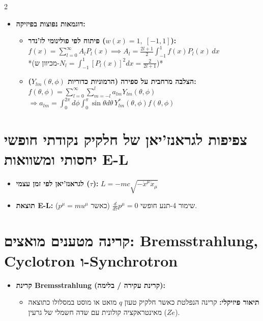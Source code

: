 \documentclass[10pt,a4paper]{article}
\begin{document}
\begin{multicols*}{2}
\begin{itemize}[leftmargin=*]
    \item \textbf{דוגמאות נפוצות בפיזיקה:}

    \begin{itemize}

        \item \textbf{פיתוח לפי פולינומי לז'נדר ($w(x)=1, \; [-1, 1]$):}\\
        $f(x) = \sum_{l=0}^{\infty} A_l P_l(x) \implies A_l = \frac{2l+1}{2} \int_{-1}^{1} f(x) P_l(x) \, dx$\\
        *(מכיוון ש-$N_l = \int_{-1}^{1} [P_l(x)]^2 dx = \frac{2}{2l+1}$)*

        \item \textbf{הצלבה מרחבית על ספירה (הרמוניות כדוריות $Y_{lm}(\theta,\phi)$):}\\
        $f(\theta,\phi) = \sum_{l=0}^{\infty} \sum_{m=-l}^{l} a_{lm} Y_{lm}(\theta,\phi)$ \\
        $\Rightarrow a_{lm} = \int_{0}^{2\pi} d\phi \int_{0}^{\pi} \sin\theta d\theta \, Y_{lm}^*(\theta,\phi) f(\theta,\phi)$
    \end{itemize}
\end{itemize}

\section*{צפיפות לגראנז'יאן של חלקיק נקודתי חופשי יחסותי ומשוואות \textenglish{E-L}}
    \begin{itemize}
        \item \textbf{לגראנז'יאן לפי זמן עצמי ($\tau$):} $L = -mc \sqrt{-\dot{x}^\mu \dot{x}_\mu}$
        \item \textbf{תוצאת \textenglish{E-L}:} שימור 4-תנע חופשי $\frac{d}{d\tau} p^\mu = 0$ (כאשר $p^\mu = m u^\mu$).
    \end{itemize}


\section*{קרינה מטענים מואצים: \textenglish{Bremsstrahlung, Cyclotron} ו-Synchrotron}

\begin{itemize}[leftmargin=*]
    \item \textbf{קרינת Bremsstrahlung (קרינת עקירה / בלימה):}
    \begin{itemize}
        \item \textbf{תיאור פיזיקלי:} קרינה הנפלטת כאשר חלקיק טעון $q$ מואט או מוסט במסלולו כתוצאה מאינטראקציה קולונית עם שדה חשמלי של גרעין ($Z e$).


\end{itemize}
\end{itemize}
\end{multicols*}
\end{document}
